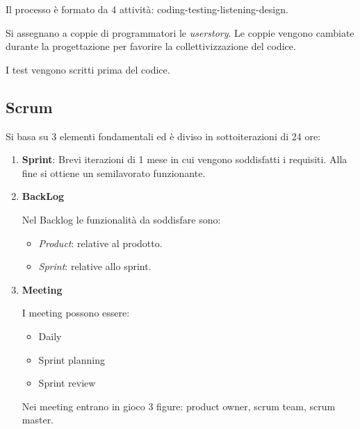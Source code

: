 \documentclass{report}
\begin{document}
\smallskip
\noindent
Il processo è formato da 4 attività: coding-testing-listening-design.

\noindent
Si assegnano a coppie di programmatori le \textit{userstory}. Le coppie vengono cambiate durante la progettazione per favorire la collettivizzazione del codice.

\noindent
I test vengono scritti prima del codice.

\subsection*{Scrum}
Si basa su 3 elementi fondamentali ed è diviso in sottoiterazioni di 24 ore:
\begin{enumerate}
    \item \textbf{Sprint}: Brevi iterazioni di 1 mese in cui vengono soddisfatti i requisiti. Alla fine si ottiene un semilavorato funzionante.
    \item \textbf{BackLog}

    \noindent
    Nel Backlog le funzionalità da soddisfare sono:
    \begin{itemize}
        \item \textit{Product}: relative al prodotto.
        \item \textit{Sprint}: relative allo sprint.
    \end{itemize}

    \item \textbf{Meeting}
    
    \noindent
    I meeting possono essere:
    \begin{itemize}
        \item Daily
        \item Sprint planning
        \item Sprint review
    \end{itemize}

    \noindent
    Nei meeting entrano in gioco 3 figure: product owner, scrum team, scrum master.
\end{enumerate}
\end{document}
